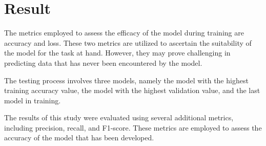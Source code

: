 \section{Result}
\label{sec:results}
 
The metrics employed to assess the efficacy of the model during training are accuracy and loss. These two metrics are utilized to ascertain the suitability of the model for the task at hand. However, they may prove challenging in predicting data that has never been encountered by the model.

The testing process involves three models, namely the model with the highest training accuracy value, the model with the highest validation value, and the last model in training.

The results of this study were evaluated using several additional metrics, including precision, recall, and F1-score. These metrics are employed to assess the accuracy of the model that has been developed.
